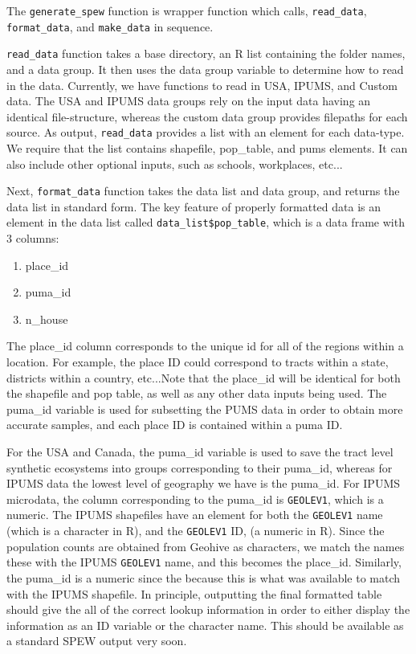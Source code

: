 \documentclass{article}
\begin{document}
The \verb|generate_spew| function is  wrapper function which calls, \verb|read_data|, \verb|format_data|, and \verb|make_data| in sequence.

\verb|read_data| function takes a base directory, an R list containing the folder names, and a data group. It then uses the data group variable to determine how to read in the data. Currently, we have functions to read in USA, IPUMS, and Custom data. The USA and IPUMS data groups rely on the input data having an identical file-structure, whereas the custom data group provides filepaths for each source. As output, \verb|read_data| provides a list with an element for each data-type. We require that the list contains shapefile, pop\_table, and pums elements. It can also include other optional inputs, such as schools, workplaces, etc...

Next, \verb|format_data| function takes the data list and data group, and returns the data list in standard form. The key feature of properly formatted data is an element in the data list called \verb|data_list$pop_table|, which is a data frame with 3 columns:

\begin{enumerate}
	\item place\_id
	\item puma\_id 
	\item n\_house 
\end{enumerate}

The place\_id column corresponds to the unique id for all of the regions within a location. For example, the place ID could correspond to tracts within a state, districts within a country, etc...Note that the place\_id will be identical for both the shapefile and pop table, as well as any other data inputs being used. The puma\_id variable is used for subsetting the PUMS data in order to obtain more accurate samples, and each place ID is contained within a puma ID. 

For the USA and Canada, the puma\_id variable is used to save the tract level synthetic ecosystems into groups corresponding to their puma\_id, whereas for IPUMS data the lowest level of geography we have is the puma\_id. For IPUMS microdata, the column corresponding to the puma\_id is \verb|GEOLEV1|, which is a numeric. The IPUMS shapefiles have an element for both the \verb|GEOLEV1| name (which is a character in R), and the \verb|GEOLEV1| ID, (a numeric in R). Since the population counts are obtained from Geohive as characters, we match the names these with the IPUMS \verb|GEOLEV1| name, and this becomes the place\_id. Similarly, the puma\_id is a numeric since the because this is what was available to match with the IPUMS shapefile. In principle, outputting the final formatted table should give the all of the correct lookup information in order to either display the information as an ID variable or the character name. This should be available as a standard SPEW output very soon. 
\end{document}
